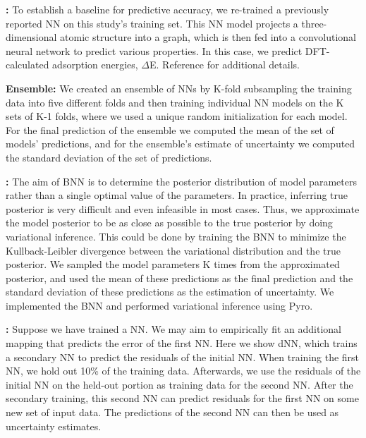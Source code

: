 \documentclass[]{achemso}
\begin{document}
\textbf{:}
To establish a baseline for predictive accuracy, we re-trained a previously reported \gls{NN}\cite{Xie2018, Back2019} on this study's training set.
This \gls{NN} model projects a three-dimensional atomic structure into a graph, which is then fed into a convolutional neural network to predict various properties.
In this case, we predict \gls{DFT}-calculated adsorption energies, $\Delta$E.
Reference \citet{Back2019} for additional details.

\textbf{ Ensemble:}
We created an ensemble of \gls{NN}s by K-fold subsampling the training data into five different folds and then training individual \gls{NN} models on the K sets of K-1 folds, where we used a unique random initialization for each model.
For the final prediction of the ensemble we computed the mean of the set of models' predictions, and for the ensemble's estimate of uncertainty we computed the standard deviation of the set of predictions.

\textbf{:}
The aim of \gls{BNN} is to determine the posterior distribution of model parameters rather than a single optimal value of the parameters.
In practice, inferring true posterior is very difficult and even infeasible in most cases.
Thus, we approximate the model posterior to be as close as possible to the true posterior by doing variational inference.
This could be done by training the \gls{BNN} to minimize the Kullback-Leibler divergence between the variational distribution and the true posterior.
We sampled the model parameters K times from the approximated posterior, and used the mean of these predictions as the final prediction and the standard deviation of these predictions as the estimation of uncertainty.
We implemented the \gls{BNN} and performed variational inference using Pyro.\cite{Bingham2018}

\textbf{:}
Suppose we have trained a \gls{NN}.
We may aim to empirically fit an additional mapping that predicts the error of the first \gls{NN}.
Here we show \gls{dNN}, which trains a secondary \gls{NN} to predict the residuals of the initial \gls{NN}.
When training the first \gls{NN}, we hold out 10\% of the training data.
Afterwards, we use the residuals of the initial \gls{NN} on the held-out portion as training data for the second \gls{NN}.
After the secondary training, this second \gls{NN} can predict residuals for the first \gls{NN} on some new set of input data.
The predictions of the second \gls{NN} can then be used as uncertainty estimates.
\end{document}
